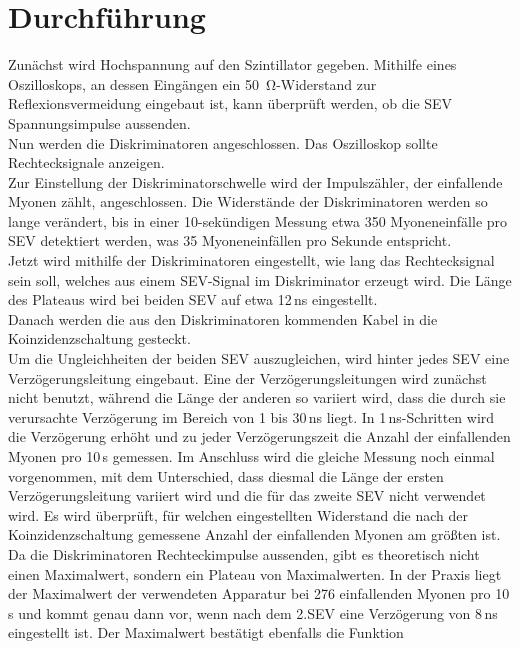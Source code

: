   \section{Durchführung}

    Zunächst wird Hochspannung auf den Szintillator gegeben. Mithilfe eines
    Oszilloskops, an dessen Eingängen ein \SI{50}{\ohm}-Widerstand zur
    Reflexionsvermeidung eingebaut ist, kann überprüft werden, ob die
    SEV Spannungsimpulse aussenden.\\
    Nun werden die Diskriminatoren angeschlossen. Das Oszilloskop
    sollte Rechtecksignale anzeigen.\\
    Zur Einstellung der Diskriminatorschwelle wird der
    Impulszähler, der einfallende Myonen zählt, angeschlossen.
    Die Widerstände der Diskriminatoren werden so lange verändert, bis in einer
    10-sekündigen Messung etwa 350 Myoneneinfälle pro SEV detektiert werden,
    was 35 Myoneneinfällen pro Sekunde entspricht.\\
    Jetzt wird mithilfe der Diskriminatoren eingestellt,
    wie lang das Rechtecksignal sein soll, welches aus einem SEV-Signal
    im Diskriminator erzeugt wird. Die Länge des Plateaus wird bei
    beiden SEV auf etwa 12\,ns eingestellt.\\
    Danach werden die aus den Diskriminatoren kommenden Kabel
    in die Koinzidenzschaltung gesteckt.\\
    Um die Ungleichheiten der beiden SEV auszugleichen, wird hinter
    jedes SEV eine Verzögerungsleitung eingebaut. Eine der Verzögerungsleitungen
    wird zunächst nicht benutzt, während die Länge der anderen so
    variiert wird,
    dass die durch sie verursachte Verzögerung im Bereich von 1 bis 30\,ns
    liegt. In 1\,ns-Schritten wird die Verzögerung erhöht und zu jeder
    Verzögerungszeit die Anzahl der einfallenden Myonen pro 10\,s gemessen.
    Im Anschluss wird die gleiche Messung noch einmal vorgenommen,
    mit dem Unterschied, dass diesmal die Länge der ersten Verzögerungsleitung
    variiert wird und die für das zweite SEV nicht verwendet wird.
    Es wird überprüft, für welchen eingestellten Widerstand die nach der
    Koinzidenzschaltung gemessene Anzahl der einfallenden Myonen am größten ist.
    Da die Diskriminatoren Rechteckimpulse aussenden, gibt es theoretisch nicht
    einen Maximalwert, sondern ein Plateau von Maximalwerten. In der
    Praxis liegt der Maximalwert der verwendeten Apparatur bei 276 einfallenden
    Myonen pro 10\,s und kommt genau dann vor, wenn nach dem 2.SEV eine Verzögerung
    von 8\,ns eingestellt ist. Der Maximalwert bestätigt ebenfalls die Funktion
